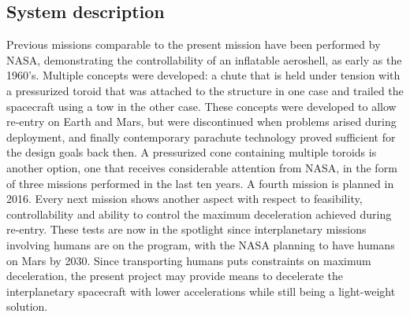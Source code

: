 \subsection{System description}
Previous missions comparable to the present mission have been performed by NASA, demonstrating the controllability of an inflatable aeroshell, as early as the 1960's. Multiple concepts were developed: a chute that is held under tension with a pressurized toroid that was attached to the structure in one case and trailed the spacecraft using a tow in the other case. These concepts were developed to allow re-entry on Earth and Mars, but were discontinued when problems arised during deployment, and finally contemporary parachute technology proved sufficient for the design goals back then.
A pressurized cone containing multiple toroids is another option, one that receives considerable attention from NASA, in the form of three missions performed in the last ten years. A fourth mission is planned in 2016. Every next mission shows another aspect with respect to feasibility, controllability and ability to control the maximum deceleration achieved during re-entry.
These tests are now in the spotlight since interplanetary missions involving humans are on the program, with the NASA planning to have humans on Mars by 2030. Since transporting humans puts constraints on maximum deceleration, the present project may provide means to decelerate the interplanetary spacecraft with lower accelerations while still being a light-weight solution.




